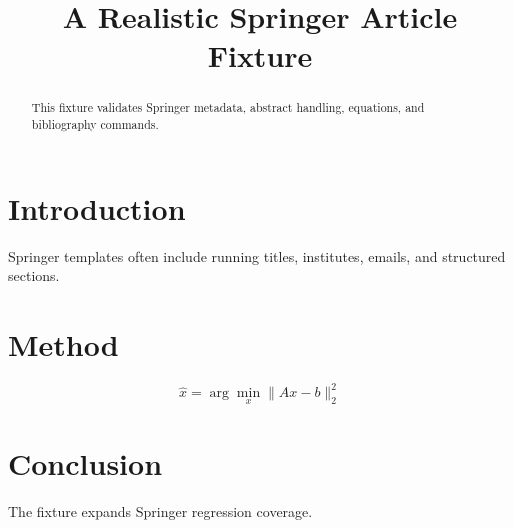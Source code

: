 \documentclass{springer}
\institute{Department of Computer Science, University of Example}
\begin{document}
\title{A Realistic Springer Article Fixture}
\maketitle
\begin{abstract}
This fixture validates Springer metadata, abstract handling, equations, and bibliography commands.
\end{abstract}
\section{Introduction}
Springer templates often include running titles, institutes, emails, and structured sections.
\section{Method}
\begin{equation}
  \hat{x} = \arg\min_x \|Ax-b\|_2^2
\end{equation}
\section{Conclusion}
The fixture expands Springer regression coverage.


\end{document}
